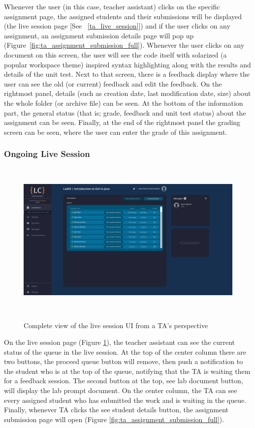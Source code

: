 \documentclass[a4paper, 12pt]{article}
\begin{document}
    Whenever the user (in this case, teacher assistant) clicks on the specific assignment page, the assigned students and their submissions will be displayed
    (the live session page [See ~\ref{ta_live_session}]) and if the user clicks on any assignment,
    an assignment submission details page will pop up (Figure~\ref{fig:ta_assignment_submission_full}). Whenever the user clicks on any document on this screen, the user will see the code itself with
    solarized (a popular workspace theme) inspired syntax highlighting along with the results and details of the unit test. Next to that screen, there is a feedback display where the user can see the old
    (or current) feedback and edit the feedback. On the rightmost panel, details (such as creation date, last modification date, size) about the whole folder
    (or archive file) can be seen. At the bottom of the information part, the general status (that is; grade, feedback and unit test status) about the assignment can be seen.
    Finally, at the end of the rightmost panel the grading screen can be seen, where the user can enter the grade of this assignment.


    \pagebreak

    \subsubsection{Ongoing Live Session}~\label{ta_live_session}

    \begin{figure}[H]
        \centering
        \includegraphics[width=\textwidth]{ta_live_session}
        \caption{Complete view of the live session UI from a TA's perspective}~\label{fig:ta_live_session_full}
    \end{figure}

    On the live session page (Figure \ref{fig:ta_live_session_full}), the teacher assistant can see the current status of the queue in the live session. At the top of the center column there are two buttons,
    the proceed queue button will remove, then push a notification to the student who is at the top of the queue, notifying that the TA is waiting them for a feedback session. The second button at the top,
    see lab document button, will display the lab prompt document. On the center column, the TA can see every assigned student who has submitted the work and is waiting in the queue. Finally, whenever TA clicks the see
    student details button, the assignment submission page will open (Figure \ref{fig:ta_assignment_submission_full}).
\end{document}
